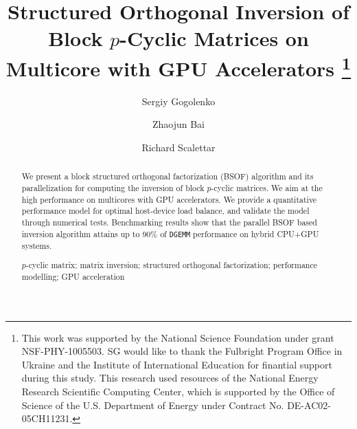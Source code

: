 \documentclass{llncs}
\newcommand{\Cuda}{{\sc CUDA}\xspace}
\begin{document}
\title{
Structured Orthogonal Inversion of Block $p$-Cyclic Matrices 
on Multicore with GPU Accelerators
\thanks{%
This work was supported by the National Science Foundation 
under grant NSF-PHY-1005503. SG would like to thank the Fulbright 
Program Office in Ukraine and the Institute of International Education 
for finantial support during this study.
This research used resources of the National Energy Research
Scientific Computing Center, which is supported by the Office of
Science of the U.S. Department of Energy under 
Contract No. DE-AC02-05CH11231.}
}

\author{Sergiy Gogolenko 
  \and Zhaojun Bai
  \and Richard Scalettar }


\maketitle


\begin{abstract}
We present a block structured orthogonal factorization (BSOF) algorithm
and its parallelization for computing the inversion of block $p$-cyclic matrices. 
We aim at the high performance on multicores with GPU accelerators. 
We provide a quantitative performance model for optimal host-device 
load balance, and validate the model through numerical tests.
Benchmarking results show that the parallel BSOF
based inversion algorithm attains up to 90\% of 
{\tt DGEMM} performance on hybrid CPU+GPU systems.

\begin{keywords}  
$p$-cyclic matrix; matrix inversion; 
structured orthogonal factorization;
performance modelling; 
GPU acceleration%
  \end{keywords}
\end{abstract}
\end{document}
